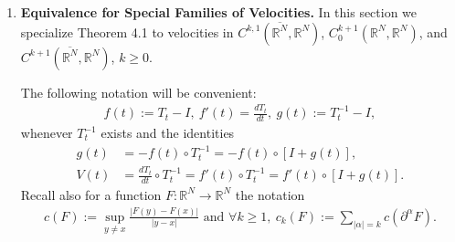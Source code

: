 \documentclass{book}
\numberwithin{equation}{section}
\newtheorem{remark}{Remark}[section]
\begin{document}
\begin{enumerate}
    \begin{remark}
        Observe that from (4.14) and (4.15) \textbf{(4.16)}
        \begin{align*}
            V(0) = U,\ \dot{V}(0)(x) = \frac{\partial V}{\partial t}(t,x)|_{t = 0} = A - [DU]U,
        \end{align*}
        where $DU$ is the Jacobian matrix of $U$.
        
        The term $\dot{V}(0)$ is an \emph{acceleration} at $t = 0$ which will always be present even when $A = 0$, but it can be eliminated by choosing $A = [DU]U$.
    \end{remark}
    \item \textbf{Equivalence for Special Families of Velocities.} In this section we specialize Theorem 4.1 to velocities in $C^{k,1}(\overline{\mathbb{R}^N},\mathbb{R}^N)$, $C_0^{k+1}(\mathbb{R}^N,\mathbb{R}^N)$, and $C^{k+1}(\overline{\mathbb{R}^N},\mathbb{R}^N)$, $k\ge 0$.
    
    The following notation will be convenient:
    \begin{align*}
        f(t) := T_t - I,\ f'(t) = \frac{dT_t}{dt},\ g(t) := T_t^{-1} - I,
    \end{align*}
    whenever $T_t^{-1}$ exists and the identities
    \begin{align*}
        g(t) &= -f(t)\circ T_t^{-1} = -f(t)\circ[I + g(t)],\\
        V(t) &= \frac{dT_t}{dt}\circ T_t^{-1} = f'(t)\circ T_t^{-1} = f'(t)\circ[I + g(t)].
    \end{align*}
    Recall also for a function $F:\mathbb{R}^N\to\mathbb{R}^N$ the notation
    \begin{align*}
        c(F) := \sup_{y\ne x} \frac{\left|F(y) - F(x)\right|}{|y - x|} \mbox{ and } \forall k\ge 1,\ c_k(F) := \sum_{|\alpha| = k} c\left(\partial^\alpha F\right).
    \end{align*}
    

\end{enumerate}
\end{document}
